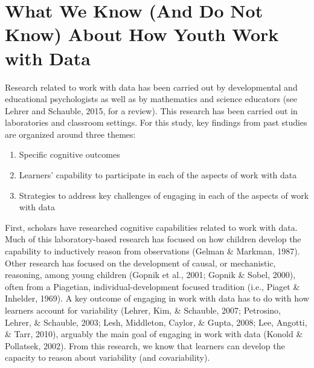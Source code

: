 \documentclass[]{msu-thesis}
\providecommand{\tightlist}{%
  \setlength{\itemsep}{0pt}\setlength{\parskip}{0pt}}
\theoremstyle{definition}
\theoremstyle{definition}
\theoremstyle{definition}
\theoremstyle{remark}
\begin{document}
\section{What We Know (And Do Not Know) About How Youth Work with
Data}\label{what-we-know-and-do-not-know-about-how-youth-work-with-data}

Research related to work with data has been carried out by developmental
and educational psychologists as well as by mathematics and science
educators (see Lehrer and Schauble, 2015, for a review). This research
has been carried out in laboratories and classroom settings. For this
study, key findings from past studies are organized around three themes:

\begin{enumerate}
\def\labelenumi{\arabic{enumi}.}
\tightlist
\item
  Specific cognitive outcomes
\item
  Learners' capability to participate in each of the aspects of work
  with data
\item
  Strategies to address key challenges of engaging in each of the
  aspects of work with data
\end{enumerate}

First, scholars have researched cognitive capabilities related to work
with data. Much of this laboratory-based research has focused on how
children develop the capability to inductively reason from observations
(Gelman \& Markman, 1987). Other research has focused on the development
of causal, or mechanistic, reasoning, among young children (Gopnik et
al., 2001; Gopnik \& Sobel, 2000), often from a Piagetian,
individual-development focused tradition (i.e., Piaget \& Inhelder,
1969). A key outcome of engaging in work with data has to do with how
learners account for variability (Lehrer, Kim, \& Schauble, 2007;
Petrosino, Lehrer, \& Schauble, 2003; Lesh, Middleton, Caylor, \& Gupta,
2008; Lee, Angotti, \& Tarr, 2010), arguably the main goal of engaging
in work with data (Konold \& Pollatsek, 2002). From this research, we
know that learners can develop the capacity to reason about variability
(and covariability).
\end{document}
